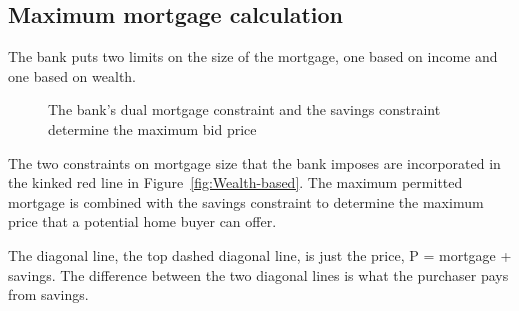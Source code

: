 \subsection{Maximum mortgage calculation}
The bank puts two  limits on the size of the mortgage, one based on income and one based on wealth.



\begin{figure}
\centering
{}
\caption{The bank's dual mortgage constraint and the savings constraint determine the maximum bid price}
\label{fig:my_label2}
\end{figure}


The two constraints on  mortgage size   that the bank imposes are incorporated in the kinked red line in Figure~\ref{fig:Wealth-based}. The maximum  permitted mortgage  is combined with the savings constraint to determine the maximum price that a potential home buyer can offer.   

The diagonal line, the top dashed diagonal line, is just the price, P = mortgage + savings.
The difference between the two diagonal lines is what the purchaser pays from savings.  

